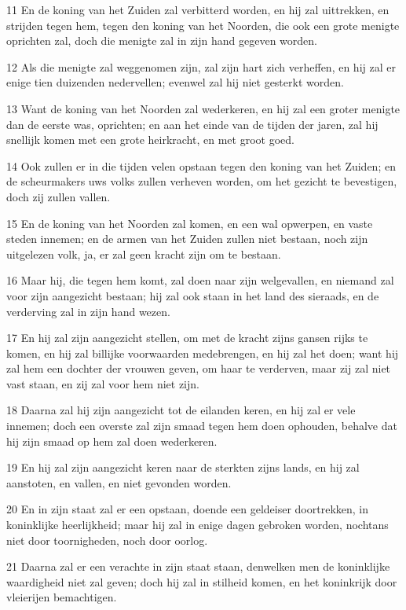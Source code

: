 \par 11 En de koning van het Zuiden zal verbitterd worden, en hij zal uittrekken, en strijden tegen hem, tegen den koning van het Noorden, die ook een grote menigte oprichten zal, doch die menigte zal in zijn hand gegeven worden.
\par 12 Als die menigte zal weggenomen zijn, zal zijn hart zich verheffen, en hij zal er enige tien duizenden nedervellen; evenwel zal hij niet gesterkt worden.
\par 13 Want de koning van het Noorden zal wederkeren, en hij zal een groter menigte dan de eerste was, oprichten; en aan het einde van de tijden der jaren, zal hij snellijk komen met een grote heirkracht, en met groot goed.
\par 14 Ook zullen er in die tijden velen opstaan tegen den koning van het Zuiden; en de scheurmakers uws volks zullen verheven worden, om het gezicht te bevestigen, doch zij zullen vallen.
\par 15 En de koning van het Noorden zal komen, en een wal opwerpen, en vaste steden innemen; en de armen van het Zuiden zullen niet bestaan, noch zijn uitgelezen volk, ja, er zal geen kracht zijn om te bestaan.
\par 16 Maar hij, die tegen hem komt, zal doen naar zijn welgevallen, en niemand zal voor zijn aangezicht bestaan; hij zal ook staan in het land des sieraads, en de verderving zal in zijn hand wezen.
\par 17 En hij zal zijn aangezicht stellen, om met de kracht zijns gansen rijks te komen, en hij zal billijke voorwaarden medebrengen, en hij zal het doen; want hij zal hem een dochter der vrouwen geven, om haar te verderven, maar zij zal niet vast staan, en zij zal voor hem niet zijn.
\par 18 Daarna zal hij zijn aangezicht tot de eilanden keren, en hij zal er vele innemen; doch een overste zal zijn smaad tegen hem doen ophouden, behalve dat hij zijn smaad op hem zal doen wederkeren.
\par 19 En hij zal zijn aangezicht keren naar de sterkten zijns lands, en hij zal aanstoten, en vallen, en niet gevonden worden.
\par 20 En in zijn staat zal er een opstaan, doende een geldeiser doortrekken, in koninklijke heerlijkheid; maar hij zal in enige dagen gebroken worden, nochtans niet door toornigheden, noch door oorlog.
\par 21 Daarna zal er een verachte in zijn staat staan, denwelken men de koninklijke waardigheid niet zal geven; doch hij zal in stilheid komen, en het koninkrijk door vleierijen bemachtigen.
